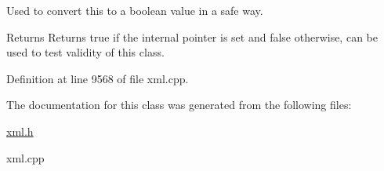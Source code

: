 Used to convert this to a boolean value in a safe way. 

\begin{DoxyReturn}{Returns}
Returns true if the internal pointer is set and false otherwise, can be used to test validity of this class. 
\end{DoxyReturn}


Definition at line 9568 of file xml.cpp.



The documentation for this class was generated from the following files:\begin{DoxyCompactItemize}
\item 
\hyperlink{xml_8h}{xml.h}\item 
xml.cpp\end{DoxyCompactItemize}
